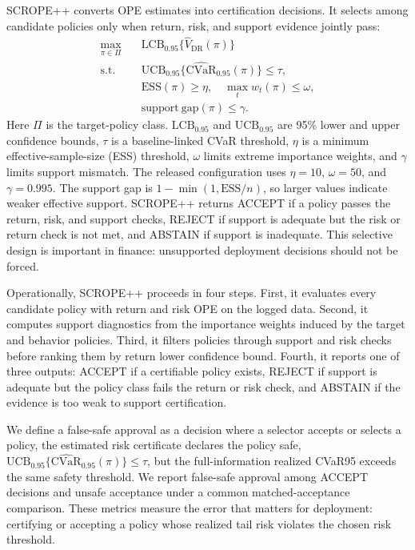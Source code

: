 \documentclass[conference]{IEEEtran}
\begin{document}
SCROPE++ converts OPE estimates into certification decisions. It selects among candidate policies only when return, risk, and support evidence jointly pass:
\begin{align}
    \max_{\pi \in \Pi} \quad & \mathrm{LCB}_{0.95}\{\widehat V_{\mathrm{DR}}(\pi)\}\\
    \mathrm{s.t.}\quad
    & \mathrm{UCB}_{0.95}\{\widehat{\mathrm{CVaR}}_{0.95}(\pi)\} \leq \tau, \\
    & \mathrm{ESS}(\pi) \geq \eta, \quad \max_t w_t(\pi) \leq \omega,\\
    & \mathrm{support\ gap}(\pi) \leq \gamma.
\end{align}
Here $\Pi$ is the target-policy class. $\mathrm{LCB}_{0.95}$ and $\mathrm{UCB}_{0.95}$ are 95\% lower and upper confidence bounds, $\tau$ is a baseline-linked CVaR threshold, $\eta$ is a minimum effective-sample-size (ESS) threshold, $\omega$ limits extreme importance weights, and $\gamma$ limits support mismatch. The released configuration uses $\eta=10$, $\omega=50$, and $\gamma=0.995$. The support gap is $1-\min(1,\mathrm{ESS}/n)$, so larger values indicate weaker effective support. SCROPE++ returns ACCEPT if a policy passes the return, risk, and support checks, REJECT if support is adequate but the risk or return check is not met, and ABSTAIN if support is inadequate. This selective design is important in finance: unsupported deployment decisions should not be forced.

Operationally, SCROPE++ proceeds in four steps. First, it evaluates every candidate policy with return and risk OPE on the logged data. Second, it computes support diagnostics from the importance weights induced by the target and behavior policies. Third, it filters policies through support and risk checks before ranking them by return lower confidence bound. Fourth, it reports one of three outputs: ACCEPT if a certifiable policy exists, REJECT if support is adequate but the policy class fails the return or risk check, and ABSTAIN if the evidence is too weak to support certification.

We define a false-safe approval as a decision where a selector accepts or selects a policy, the estimated risk certificate declares the policy safe, $\mathrm{UCB}_{0.95}\{\widehat{\mathrm{CVaR}}_{0.95}(\pi)\}\leq\tau$, but the full-information realized CVaR95 exceeds the same safety threshold. We report false-safe approval among ACCEPT decisions and unsafe acceptance under a common matched-acceptance comparison. These metrics measure the error that matters for deployment: certifying or accepting a policy whose realized tail risk violates the chosen risk threshold.
\end{document}
